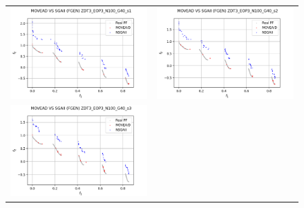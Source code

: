 \begin{figure}[H]
    \centering
    \begin{tabular}{c c}
    \includegraphics[scale=0.5]{figures/ZDT3_EOP3_N100_G40_T15/s1_comp.png} &
    \includegraphics[scale=0.5]{figures/ZDT3_EOP3_N100_G40_T15/s2_comp.png}\\
    \includegraphics[scale=0.5]{figures/ZDT3_EOP3_N100_G40_T15/s3_comp.png} &

\end{tabular}
\end{figure}
